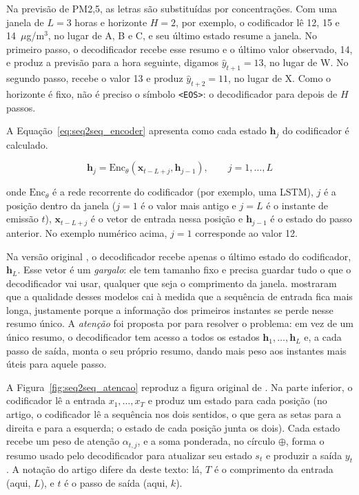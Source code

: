 Na previsão de PM2,5, as letras são substituídas por concentrações. Com uma janela de \(L=3\) horas e horizonte \(H=2\), por exemplo, o codificador lê 12, 15 e 14~\(\mu\)g/m\(^3\), no lugar de A, B e C, e seu último estado resume a janela. No primeiro passo, o decodificador recebe esse resumo e o último valor observado, 14, e produz a previsão para a hora seguinte, digamos \(\hat{y}_{t+1}=13\), no lugar de W. No segundo passo, recebe o valor 13 e produz \(\hat{y}_{t+2}=11\), no lugar de X. Como o horizonte é fixo, não é preciso o símbolo \texttt{<EOS>}: o decodificador para depois de \(H\) passos.

A Equação~\ref{eq:seq2seq_encoder} apresenta como cada estado \(\mathbf{h}_j\) do codificador é calculado.

\begin{equation}
    \mathbf{h}_j = \mathrm{Enc}_{\theta}(\mathbf{x}_{t-L+j}, \mathbf{h}_{j-1}),
    \qquad
    j=1,\ldots,L
    \label{eq:seq2seq_encoder}
\end{equation}

\noindent onde \(\mathrm{Enc}_{\theta}\) é a rede recorrente do codificador (por exemplo, uma LSTM), \(j\) é a posição dentro da janela (\(j=1\) é o valor mais antigo e \(j=L\) é o instante de emissão \(t\)), \(\mathbf{x}_{t-L+j}\) é o vetor de entrada nessa posição e \(\mathbf{h}_{j-1}\) é o estado do passo anterior. No exemplo numérico acima, \(j=1\) corresponde ao valor 12.

Na versão original \cite{sutskever2014sequence}, o decodificador recebe apenas o último estado do codificador, \(\mathbf{h}_L\). Esse vetor é um \emph{gargalo}: ele tem tamanho fixo e precisa guardar tudo o que o decodificador vai usar, qualquer que seja o comprimento da janela.  mostraram que a qualidade desses modelos cai à medida que a sequência de entrada fica mais longa, justamente porque a informação dos primeiros instantes se perde nesse resumo único. A \emph{atenção} foi proposta por  para resolver o problema: em vez de um único resumo, o decodificador tem acesso a todos os estados \(\mathbf{h}_1,\ldots,\mathbf{h}_L\) e, a cada passo de saída, monta o seu próprio resumo, dando mais peso aos instantes mais úteis para aquele passo.

A Figura~\ref{fig:seq2seq_atencao} reproduz a figura original de . Na parte inferior, o codificador lê a entrada \(x_1,\ldots,x_T\) e produz um estado para cada posição (no artigo, o codificador lê a sequência nos dois sentidos, o que gera as setas para a direita e para a esquerda; o estado de cada posição junta os dois). Cada estado recebe um peso de atenção \(\alpha_{t,j}\), e a soma ponderada, no círculo \(\oplus\), forma o resumo usado pelo decodificador para atualizar seu estado \(s_t\) e produzir a saída \(y_t\). A notação do artigo difere da deste texto: lá, \(T\) é o comprimento da entrada (aqui, \(L\)), e \(t\) é o passo de saída (aqui, \(k\)).

